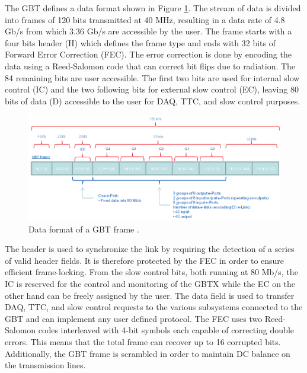       The GBT defines a data format shown in Figure \ref{fig:II-2-gbt-frame}. The stream of data is divided into frames of 120 bits transmitted at 40 MHz, resulting in a data rate of 4.8 Gb/s from which 3.36 Gb/s are accessible by the user. The frame starts with a four bits header (H) which defines the frame type and ends with 32 bits of Forward Error Correction (FEC). The error correction is done by encoding the data using a Reed-Salomon code that can correct bit flips due to radiation. The 84 remaining bits are user accessible. The first two bits are used for internal slow control (IC) and the two following bits for external slow control (EC), leaving 80 bits of data (D) accessible to the user for DAQ, TTC, and slow control purposes. \\

      \begin{figure}[h!]
        \centering
        \includegraphics[width=\textwidth]{img/II-2-daq/gbt-frame.pdf}
        \caption{Data format of a GBT frame \cite{Moreira:1235836}.}
        \label{fig:II-2-gbt-frame}
      \end{figure}

      The header is used to synchronize the link by requiring the detection of a series of valid header fields. It is therefore protected by the FEC in order to ensure efficient frame-locking. From the slow control bits, both running at 80 Mb/s, the IC is reserved for the control and monitoring of the GBTX while the EC on the other hand can be freely assigned by the user. The data field is used to transfer DAQ, TTC, and slow control requests to the various subsystems connected to the GBT and can implement any user defined protocol. The FEC uses two Reed-Salomon codes interleaved with 4-bit symbols each capable of correcting double errors. This means that the total frame can recover up to 16 corrupted bits. Additionally, the GBT frame is scrambled in order to maintain DC balance on the transmission lines. \\

